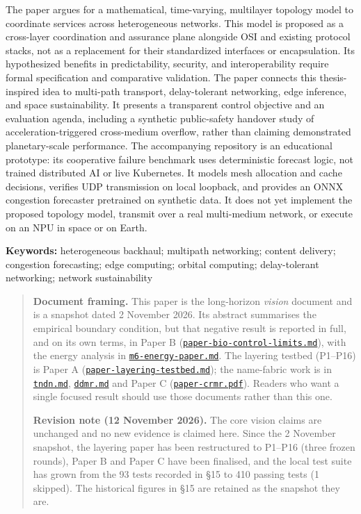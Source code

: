 \documentclass[
  american,
  11pt,
]{article}
\begin{document}
The paper argues for a mathematical, time-varying, multilayer topology
model to coordinate services across heterogeneous networks. This model
is proposed as a cross-layer coordination and assurance plane alongside
OSI and existing protocol stacks, not as a replacement for their
standardized interfaces or encapsulation. Its hypothesized benefits in
predictability, security, and interoperability require formal
specification and comparative validation. The paper connects this
thesis-inspired idea to multi-path transport, delay-tolerant networking,
edge inference, and space sustainability. It presents a transparent
control objective and an evaluation agenda, including a synthetic
public-safety handover study of acceleration-triggered cross-medium
overflow, rather than claiming demonstrated planetary-scale performance.
The accompanying repository is an educational prototype: its cooperative
failure benchmark uses deterministic forecast logic, not trained
distributed AI or live Kubernetes. It models mesh allocation and cache
decisions, verifies UDP transmission on local loopback, and provides an
ONNX congestion forecaster pretrained on synthetic data. It does not yet
implement the proposed topology model, transmit over a real multi-medium
network, or execute on an NPU in space or on Earth.

\textbf{Keywords:} heterogeneous backhaul; multipath networking; content
delivery; congestion forecasting; edge computing; orbital computing;
delay-tolerant networking; network sustainability

\begin{quote}
\textbf{Document framing.} This paper is the long-horizon \emph{vision}
document and is a snapshot dated 2 November 2026. Its abstract
summarises the empirical boundary condition, but that negative result is
reported in full, and on its own terms, in Paper B
(\href{paper-bio-control-limits.md}{\texttt{paper-bio-control-limits.md}}),
with the energy analysis in
\href{m6-energy-paper.md}{\texttt{m6-energy-paper.md}}. The layering
testbed (P1--P16) is Paper A
(\href{paper-layering-testbed.md}{\texttt{paper-layering-testbed.md}});
the name-fabric work is in \href{tndn.md}{\texttt{tndn.md}},
\href{ddmr.md}{\texttt{ddmr.md}} and Paper C
(\href{paper-crmr.pdf}{\texttt{paper-crmr.pdf}}). Readers who want a
single focused result should use those documents rather than this one.

\textbf{Revision note (12 November 2026).} The core vision claims are
unchanged and no new evidence is claimed here. Since the 2 November
snapshot, the layering paper has been restructured to P1--P16 (three
frozen rounds), Paper B and Paper C have been finalised, and the local
test suite has grown from the 93 tests recorded in §15 to 410 passing
tests (1 skipped). The historical figures in §15 are retained as the
snapshot they are.
\end{quote}
\end{document}
